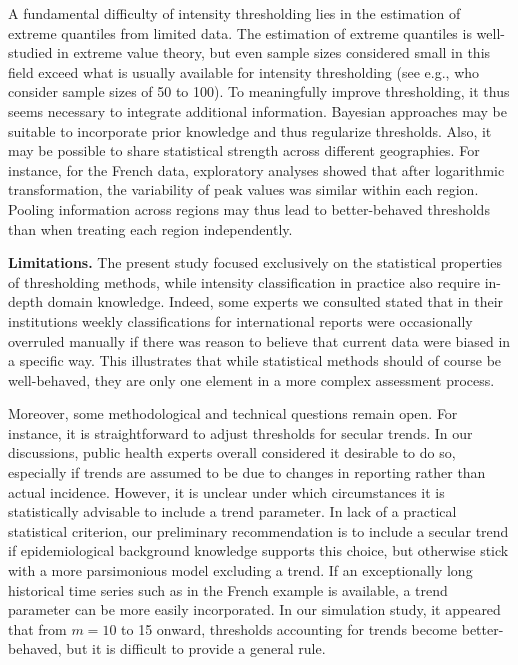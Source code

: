 \documentclass[12pt]{article}
\begin{document}
A fundamental difficulty of intensity thresholding lies in the estimation of extreme quantiles from limited data. The estimation of extreme quantiles is well-studied in extreme value theory, but even sample sizes considered small in this field exceed what is usually available for intensity thresholding (see e.g., \citealt{Pisarenko2017} who consider sample sizes of 50 to 100). To meaningfully improve thresholding, it thus seems necessary to integrate additional information. Bayesian approaches may be suitable to incorporate prior knowledge and thus regularize thresholds. Also, it may be possible to share statistical strength across different geographies. For instance, for the French data, exploratory analyses showed that after logarithmic transformation, the variability of peak values was similar within each region. Pooling information across regions may thus lead to better-behaved thresholds than when treating each region independently.





\noindent \textbf{Limitations.} The present study focused exclusively on the statistical properties of thresholding methods, while intensity classification in practice also require in-depth domain knowledge. Indeed, some experts we consulted stated that in their institutions weekly classifications for international reports were occasionally overruled manually if there was reason to believe that current data were biased in a specific way. This illustrates that while statistical methods should of course be well-behaved, they are only one element in a more complex assessment process.

Moreover, some methodological and technical questions remain open. For instance, it is straightforward to adjust thresholds for secular trends. In our discussions, public health experts overall considered it desirable to do so, especially if trends are assumed to be due to changes in reporting rather than actual incidence. However, it is unclear under which circumstances it is statistically advisable to include a trend parameter. In lack of a practical statistical criterion, our preliminary recommendation is to include a secular trend if epidemiological background knowledge supports this choice, but otherwise stick with a more parsimonious model excluding a trend. If an exceptionally long historical time series such as in the French example is available, a trend parameter can be more easily incorporated. In our simulation study, it appeared that from $m = 10$ to 15 onward, thresholds accounting for trends become better-behaved, but it is difficult to provide a general rule.
\end{document}
